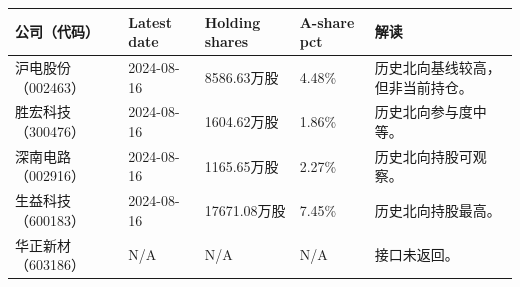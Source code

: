 \begin{exhibitbox}
\footnotesize
\begin{tabularx}{\textwidth}{L{1.8cm}R{1.9cm}R{2.0cm}R{1.6cm}X}
\toprule
\textbf{公司（代码）} & \textbf{Latest date} & \textbf{Holding shares} & \textbf{A-share pct} & \textbf{解读} \\
\midrule
沪电股份（002463） & 2024-08-16 & 8586.63万股 & 4.48\% & 历史北向基线较高，但非当前持仓。 \\
胜宏科技（300476） & 2024-08-16 & 1604.62万股 & 1.86\% & 历史北向参与度中等。 \\
深南电路（002916） & 2024-08-16 & 1165.65万股 & 2.27\% & 历史北向持股可观察。 \\
生益科技（600183） & 2024-08-16 & 17671.08万股 & 7.45\% & 历史北向持股最高。 \\
华正新材（603186） & N/A & N/A & N/A & 接口未返回。 \\
\bottomrule
\end{tabularx}
\end{exhibitbox}

